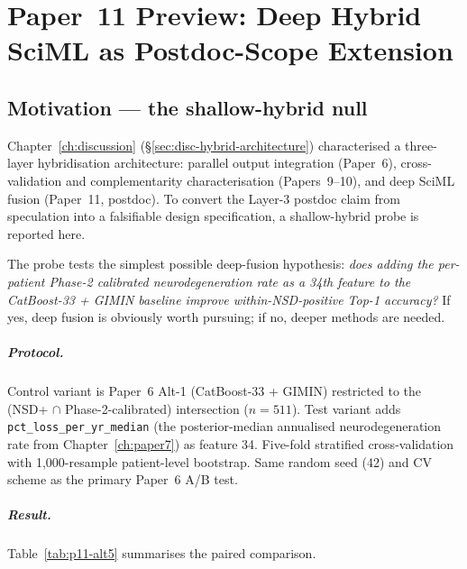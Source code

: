 
\chapter{Paper~11 Preview: Deep Hybrid SciML as Postdoc-Scope Extension}
\label{ch:paper11-preview}

\section{Motivation --- the shallow-hybrid null}
\label{sec:p11-motivation}

Chapter~\ref{ch:discussion} (\S\ref{sec:disc-hybrid-architecture}) characterised a three-layer hybridisation architecture: parallel output integration (Paper~6), cross-validation and complementarity characterisation (Papers~9--10), and deep SciML fusion (Paper~11, postdoc). To convert the Layer-3 postdoc claim from speculation into a falsifiable design specification, a shallow-hybrid probe is reported here.

The probe tests the simplest possible deep-fusion hypothesis: \emph{does adding the per-patient Phase-2 calibrated neurodegeneration rate as a 34th feature to the CatBoost-33 + GIMIN baseline improve within-NSD-positive Top-1 accuracy?} If yes, deep fusion is obviously worth pursuing; if no, deeper methods are needed.

\paragraph{Protocol.} Control variant is Paper~6 Alt-1 (CatBoost-33 + GIMIN) restricted to the (NSD+ $\cap$ Phase-2-calibrated) intersection ($n = 511$). Test variant adds \texttt{pct\_loss\_per\_yr\_median} (the posterior-median annualised neurodegeneration rate from Chapter~\ref{ch:paper7}) as feature 34. Five-fold stratified cross-validation with 1{,}000-resample patient-level bootstrap. Same random seed (42) and CV scheme as the primary Paper~6 A/B test.

\paragraph{Result.} Table~\ref{tab:p11-alt5} summarises the paired comparison.

